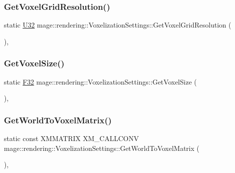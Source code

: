 \subsubsection{\texorpdfstring{Get\+Voxel\+Grid\+Resolution()}{GetVoxelGridResolution()}}
{\footnotesize\ttfamily static \hyperlink{namespacemage_a41c104c036fba3756a74e19f793eeaa1}{U32} mage\+::rendering\+::\+Voxelization\+Settings\+::\+Get\+Voxel\+Grid\+Resolution (\begin{DoxyParamCaption}{ }\end{DoxyParamCaption})\hspace{0.3cm}{\ttfamily [static]}, {\ttfamily [noexcept]}}

\hypertarget{classmage_1_1rendering_1_1_voxelization_settings_ae9c6e798bef7bbbb3031026eccbe6873}{}\label{classmage_1_1rendering_1_1_voxelization_settings_ae9c6e798bef7bbbb3031026eccbe6873} 
\subsubsection{\texorpdfstring{Get\+Voxel\+Size()}{GetVoxelSize()}}
{\footnotesize\ttfamily static \hyperlink{namespacemage_aa97e833b45f06d60a0a9c4fc22ae02c0}{F32} mage\+::rendering\+::\+Voxelization\+Settings\+::\+Get\+Voxel\+Size (\begin{DoxyParamCaption}{ }\end{DoxyParamCaption})\hspace{0.3cm}{\ttfamily [static]}, {\ttfamily [noexcept]}}

\hypertarget{classmage_1_1rendering_1_1_voxelization_settings_ac0eb16df3bfae7218b27e1c1cdf1399f}{}\label{classmage_1_1rendering_1_1_voxelization_settings_ac0eb16df3bfae7218b27e1c1cdf1399f} 
\subsubsection{\texorpdfstring{Get\+World\+To\+Voxel\+Matrix()}{GetWorldToVoxelMatrix()}}
{\footnotesize\ttfamily static const X\+M\+M\+A\+T\+R\+IX X\+M\+\_\+\+C\+A\+L\+L\+C\+O\+NV mage\+::rendering\+::\+Voxelization\+Settings\+::\+Get\+World\+To\+Voxel\+Matrix (\begin{DoxyParamCaption}{ }\end{DoxyParamCaption})\hspace{0.3cm}{\ttfamily [static]}, {\ttfamily [noexcept]}}

